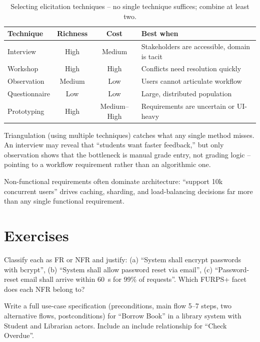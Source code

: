 \begin{table}[h]
\centering\small
\begin{tabular}{@{}lccp{4.2cm}@{}}
\toprule
Technique & Richness & Cost & Best when \\ \midrule
Interview & High & Medium & Stakeholders are accessible, domain is tacit \\
Workshop & High & High & Conflicts need resolution quickly \\
Observation & Medium & Low & Users cannot articulate workflow \\
Questionnaire & Low & Low & Large, distributed population \\
Prototyping & High & Medium--High & Requirements are uncertain or UI-heavy \\
\bottomrule
\end{tabular}
\caption{Selecting elicitation techniques -- no single technique suffices; combine at least two.}
\end{table}

Triangulation (using multiple techniques) catches what any single method misses. An interview may reveal that ``students want faster feedback,'' but only observation shows that the bottleneck is manual grade entry, not grading logic -- pointing to a workflow requirement rather than an algorithmic one.


\begin{remark}
Non-functional requirements often dominate architecture: ``support 10k concurrent users'' drives caching, sharding, and load-balancing decisions far more than any single functional requirement.
\end{remark}

\section{Exercises}

\begin{exercise}
Classify each as FR or NFR and justify: (a) ``System shall encrypt passwords with bcrypt'', (b) ``System shall allow password reset via email'', (c) ``Password-reset email shall arrive within 60~s for 99\% of requests''. Which FURPS+ facet does each NFR belong to?
\end{exercise}

\begin{exercise}
Write a full use-case specification (preconditions, main flow 5--7 steps, two alternative flows, postconditions) for ``Borrow Book'' in a library system with Student and Librarian actors. Include an include relationship for ``Check Overdue''.
\end{exercise}

